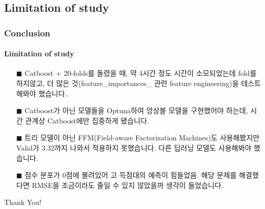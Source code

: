 \documentclass{beamer}
\begin{document}
\subsection{Limitation of study}

\begin{frame}
\frametitle{Conclusion}
\framesubtitle{Limitation of study}

\begin{itemize}
\item[$\blacksquare$] {\footnotesize Catboost + 20-folds를 돌렸을 때, 약 4시간 정도 시간이 소모되었는데 fold를 하지않고, 더 많은 것(feature\_importances\_ 관련 feature engineering)을 테스트해봐야 했습니다..}
\item[$\blacksquare$] {\footnotesize Catboost가 아닌 모델들을 Optuna하여 앙상블 모델을 구현했어야 하는데, 시간 관계상 Catboost에만 집중하게 됐습니다.}
\item[$\blacksquare$] {\footnotesize 트리 모델이 아닌 FFM(Field-aware Factorization Machines)도 사용해봤지만 Valid가 3.32까지 나와서 적용하지 못했습니다. 다른 딥러닝 모델도 사용해봐야 했습니다.}
\item[$\blacksquare$] {\footnotesize 점수 분포가 0점에 몰려있어 고 득점대의 예측이 힘들었음. 해당 문제를 해결했다면 RMSE을 조금이라도 줄일 수 있지 않았을까 생각이 들었습니다.}

\end{itemize}

\end{frame}


\begin{frame}
\begin{center}
\Huge Thank You!
\end{center}
\end{frame}
\end{document}
